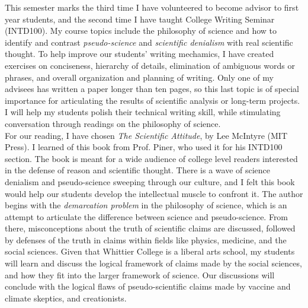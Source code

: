 \documentclass[../../../main.tex]{subfiles}
\begin{document}
\label{sec:first_year}

This semester marks the third time I have volunteered to become advisor to first year students, and the second time I have taught College Writing Seminar (INTD100).  My course topics include the philosophy of science and how to identify and contrast \textit{pseudo-science} and \textit{scientific denialism} with real scientific thought.  To help improve our students' writing mechamics, I have created exercises on conciseness, hierarchy of details, elimination of ambiguous words or phrases, and overall organization and planning of writing.  Only one of my advisees has written a paper longer than ten pages, so this last topic is of special importance for articulating the results of scientific analysis or long-term projects.  I will help my students polish their technical writing skill, while stimulating conversation through readings on the philosophy of science.
\\
\vspace{0.25cm}
For our reading, I have chosen \textit{The Scientific Attitude}, by Lee McIntyre (MIT Press).  I learned of this book from Prof. Piner, who used it for his INTD100 section.  The book is meant for a wide audience of college level readers interested in the defense of reason and scientific thought.  There is a wave of science denialism and pseudo-science sweeping through our culture, and I felt this book would help our students develop the intellectual muscle to confront it.  The author begins with the \textit{demarcation problem} in the philosophy of science, which is an attempt to articulate the difference between science and pseudo-science.  From there, misconceptions about the truth of scientific claims are discussed, followed by defenses of the truth in claims within fields like physics, medicine, and the social sciences.  Given that Whittier College is a liberal arts school, my students will learn and discuss the logical framework of claims made by the social sciences, and how they fit into the larger framework of science.  Our discussions will conclude with the logical flaws of pseudo-scientific claims made by vaccine and climate skeptics, and creationists.
\end{document}
